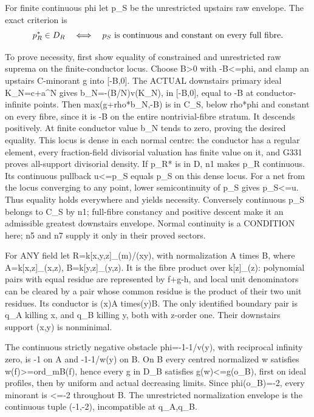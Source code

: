 \documentclass[11pt]{article}
\begin{document}
For finite continuous phi let p\_S be the unrestricted upstairs raw envelope. The exact criterion is
\[
p_R^*\in D_R\quad\Longleftrightarrow\quad
p_S\hbox{ is continuous and constant on every full fibre}.
\]

To prove necessity, first show equality of constrained and unrestricted raw suprema on the finite-conductor locus. Choose B>0 with -B<=phi, and clamp an upstairs C-minorant g into [-B,0]. The ACTUAL downstairs primary ideal K\_N=c+a\textasciicircum{}N gives b\_N=-(B/N)v(K\_N), in [-B,0], equal to -B at conductor-infinite points. Then max(g+rho*b\_N,-B) is in C\_S, below rho*phi and constant on every fibre, since it is -B on the entire nontrivial-fibre stratum. It descends positively. At finite conductor value b\_N tends to zero, proving the desired equality. This locus is dense in each normal centre: the conductor has a regular element, every fraction-field divisorial valuation has finite value on it, and G331 proves all-support divisorial density. If p\_R* is in D, n1 makes p\_R continuous. Its continuous pullback u<=p\_S equals p\_S on this dense locus. For a net from the locus converging to any point, lower semicontinuity of p\_S gives p\_S<=u. Thus equality holds everywhere and yields necessity. Conversely continuous p\_S belongs to C\_S by n1; full-fibre constancy and positive descent make it an admissible greatest downstairs envelope. Normal continuity is a CONDITION here; n5 and n7 supply it only in their proved sectors.

For ANY field let R=k[x,y,z]\_(m)/(xy), with normalization A times B, where A=k[x,z]\_(x,z), B=k[y,z]\_(y,z). It is the fibre product over k[z]\_(z): polynomial pairs with equal residue are represented by f+g-h, and local unit denominators can be cleared by a pair whose common residue is the product of their two unit residues. Its conductor is (x)A times(y)B. The only identified boundary pair is q\_A killing x, and q\_B killing y, both with z-order one. Their downstairs support (x,y) is nonminimal.

The continuous strictly negative obstacle phi=-1-1/v(y), with reciprocal infinity zero, is -1 on A and -1-1/w(y) on B. On B every centred normalized w satisfies w(f)>=ord\_mB(f), hence every g in D\_B satisfies g(w)<=g(o\_B), first on ideal profiles, then by uniform and actual decreasing limits. Since phi(o\_B)=-2, every minorant is <=-2 throughout B. The unrestricted normalization envelope is the continuous tuple (-1,-2), incompatible at q\_A,q\_B.
\end{document}

